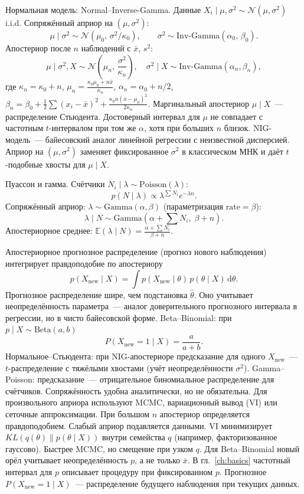 Нормальная модель: Normal--Inverse-Gamma. Данные $X_i\mid\mu,\sigma^2\sim\mathcal{N}(\mu,\sigma^2)$ i.i.d.
Сопряжённый априор на $(\mu,\sigma^2)$: \[ \mu\mid\sigma^2 \sim \mathcal{N}(\mu_0,\,\sigma^2/\kappa_0), \qquad \sigma^2 \sim \mathrm{Inv\text{-}Gamma}(\alpha_0,\,\beta_0).
\] Апостериор после $n$ наблюдений с $\bar x$, $s^2$: \[ \mu\mid\sigma^2,X \sim \mathcal{N}\!\left(\mu_n,\,\frac{\sigma^2}{\kappa_n}\right), \quad \sigma^2\mid X \sim \mathrm{Inv\text{-}Gamma}(\alpha_n,\beta_n), \] где $\kappa_n=\kappa_0+n$, $\mu_n=\frac{\kappa_0\mu_0+n\bar x}{\kappa_n}$, $\alpha_n=\alpha_0+n/2$, $\beta_n=\beta_0+\frac12\sum(x_i-\bar x)^2+\frac{\kappa_0 n(\bar x-\mu_0)^2}{2\kappa_n}$.
Маргинальный апостериор $\mu\mid X$~--- распределение Стьюдента. Достоверный интервал для $\mu$ не совпадает с частотным $t$-интервалом при том же $\alpha$, хотя при больших $n$ близок.
NIG-модель~--- байесовский аналог линейной регрессии с неизвестной дисперсией. Априор на $(\mu,\sigma^2)$ заменяет фиксированное $\sigma^2$ в классическом МНК и даёт $t$-подобные хвосты для $\mu\mid X$.

Пуассон и гамма. Счётчики $N_i\mid\lambda\sim\mathrm{Poisson}(\lambda)$: \[ p(N\mid\lambda)\propto \lambda^{\sum N_i} e^{-\lambda n}.
\] Сопряжённый априор: $\lambda\sim\mathrm{Gamma}(\alpha,\beta)$ (параметризация $\mathrm{rate}=\beta$): \[ \lambda\mid N \sim \mathrm{Gamma}\!\left(\alpha+\sum N_i,\;\beta+n\right).
\] Апостериорное среднее: $\mathbb{E}(\lambda\mid N)=\frac{\alpha+\sum N_i}{\beta+n}$.

Апостериорное прогнозное распределение (прогноз нового наблюдения) интегрирует правдоподобие по апостериору \[ p(X_{\mathrm{new}}\mid X)=\int p(X_{\mathrm{new}}\mid\theta)\,p(\theta\mid X)\,\mathrm{d}\theta.
\] Прогнозное распределение шире, чем подстановка $\hat\theta$. Оно учитывает неопределённость параметра~--- аналог доверительного прогнозного интервала в регрессии, но в чисто байесовской форме.
Beta--Binomial: при $p\mid X\sim\mathrm{Beta}(a,b)$ \[ P(X_{\mathrm{new}}=1\mid X)=\frac{a}{a+b}.
\] Нормальное--Стьюдента: при NIG-апостериоре предсказание для одного $X_{\mathrm{new}}$~--- $t$-распределение с тяжёлыми хвостами (учёт неопределённости $\sigma^2$).
Gamma--Poisson: предсказание~--- отрицательное биномиальное распределение для счётчиков.
Сопряжённость удобна аналитически, но не обязательна. Для произвольного априора используют MCMC, вариационный вывод (VI) или сеточные аппроксимации.
При большом $n$ апостериор определяется правдоподобием. Слабый априор подавляется данными. VI минимизирует $KL(q(\theta)\|p(\theta\mid X))$ внутри семейства $q$ (например, факторизованное гауссово). Быстрее MCMC, но смещение при узком $q$.
Для Beta--Binomial новый орёл учитывает неопределённость $p$, а не только $\bar x$.
В гл.~\ref{ch:basics} частотный интервал для $p$ описывает процедуру при фиксированном $p$. Прогнозное $P(X_{\mathrm{new}}=1\mid X)$~--- распределение будущего наблюдения при текущих данных.

